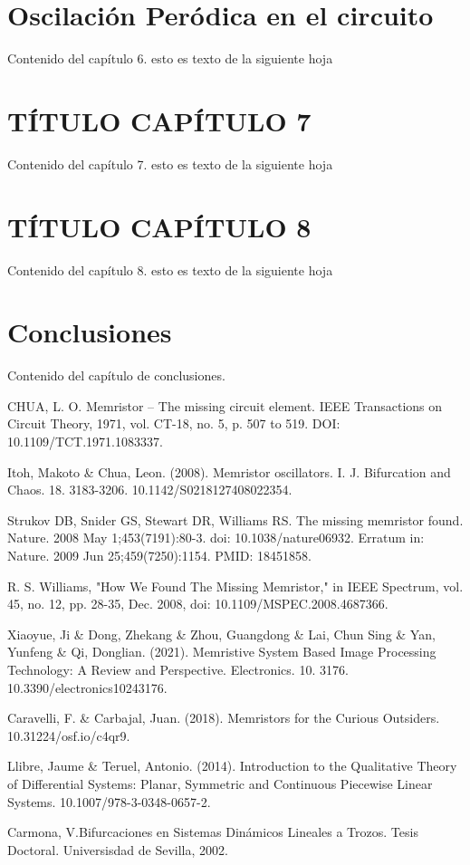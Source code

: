 \documentclass[12pt,a4paper]{report} %
\begin{document}
	\chapter{Oscilación Peródica en el circuito}
	Contenido del capítulo 6.
	\newpage
	esto es texto de la siguiente hoja
	
	\chapter{TÍTULO CAPÍTULO 7}
	Contenido del capítulo 7.
	\newpage
	esto es texto de la siguiente hoja
	
	\chapter{TÍTULO CAPÍTULO 8}
	Contenido del capítulo 8.
	\newpage
	esto es texto de la siguiente hoja
	
	\chapter*{Conclusiones}
	Contenido del capítulo de conclusiones.
	\newpage
	
	
	\begin{thebibliography}{99}
		 CHUA, L. O. Memristor – The missing circuit element. IEEE
		Transactions on Circuit Theory, 1971, vol. CT-18, no. 5, p. 507 to
		519. DOI: 10.1109/TCT.1971.1083337.
		
		 Itoh, Makoto \& Chua, Leon. (2008). Memristor oscillators. I. J. Bifurcation and Chaos. 18. 3183-3206. 10.1142/S0218127408022354. 
		
		 Strukov DB, Snider GS, Stewart DR, Williams RS. The missing memristor found. Nature. 2008 May 1;453(7191):80-3. doi: 10.1038/nature06932. Erratum in: Nature. 2009 Jun 25;459(7250):1154. PMID: 18451858.
		
		 R. S. Williams, "How We Found The Missing Memristor," in IEEE Spectrum, vol. 45, no. 12, pp. 28-35, Dec. 2008, doi: 10.1109/MSPEC.2008.4687366.
		
		 Xiaoyue, Ji \& Dong, Zhekang \& Zhou, Guangdong \& Lai, Chun Sing \& Yan, Yunfeng \& Qi, Donglian. (2021). Memristive System Based Image Processing Technology: A Review and Perspective. Electronics. 10. 3176. 10.3390/electronics10243176. 
		
		 Caravelli, F. \& Carbajal, Juan. (2018). Memristors for the Curious Outsiders. 10.31224/osf.io/c4qr9. 
		
		 Llibre, Jaume \& Teruel, Antonio. (2014). Introduction to the Qualitative Theory of Differential Systems: Planar, Symmetric and Continuous Piecewise Linear Systems. 10.1007/978-3-0348-0657-2. 
		
		 Carmona, V.Bifurcaciones en Sistemas Dinámicos Lineales a Trozos. Tesis Doctoral. Universisdad de Sevilla, 2002.
		
	\end{thebibliography}
	
\end{document}
